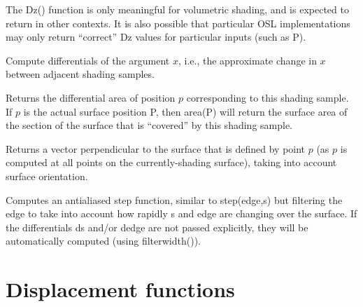 \documentclass[11pt,letterpaper]{book}
\def\P{{\cf P}\xspace}
\begin{document}
The {\cf Dz()} function is only meaningful for volumetric shading, and
is expected to return {} in other contexts.  It is also possible
that particular OSL implementations may only return ``correct'' {\cf Dz}
values for particular inputs (such as \P).
\apiend

Compute differentials of the argument $x$, i.e., the approximate change
in $x$ between adjacent shading samples.
\apiend


Returns the differential area of position $p$ corresponding to this
shading sample.  If $p$ is the actual surface position \P, then 
{\ce area(P)} will return the surface area of the section of the
surface that is ``covered'' by this shading sample.
\apiend

Returns a vector perpendicular to the surface that is defined by point
$p$ (as $p$ is computed at all points on the currently-shading surface),
taking into account surface orientation.
\apiend

Computes an antialiased step function, similar to {\cf step(edge,s)} but
filtering the edge to take into account how rapidly {\cf s} and {\cf edge}
are changing over the surface.  If the differentials {\cf ds} and/or
{\cf dedge} are not passed explicitly, they will be automatically 
computed (using {\cf filterwidth()}).
\apiend


\section{Displacement functions}
\label{sec:stdlib:displace}

\end{document}
